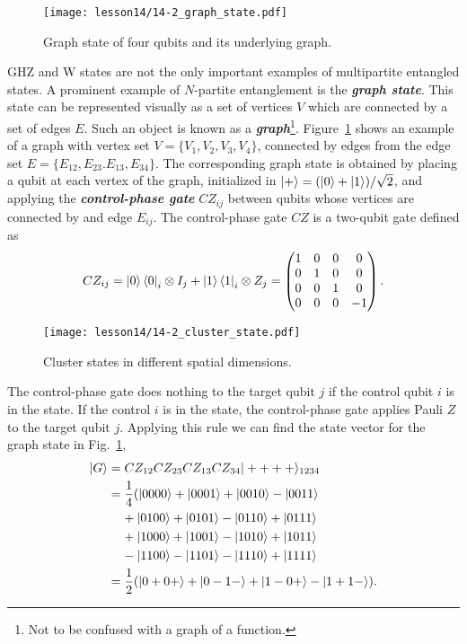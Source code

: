 \begin{figure}[t]
    \centering
    \texttt{[image: lesson14/14-2\_graph\_state.pdf]}
    \caption[Graph state.]{Graph state of four qubits and its underlying graph.}
    \label{fig:14-2_graph_state}
\end{figure}

GHZ and W states are not the only important examples of multipartite entangled states.
A prominent example of $N$-partite entanglement is the \textbf{\textit{graph state}}.
This state can be represented visually as a set of vertices $V$ which are connected by a set of edges $E$.
Such an object is known as a \textit{\textbf{graph}}\footnote{Not to be confused with a graph of a function.}.
Figure~\ref{fig:14-2_graph_state} shows an example of a graph with vertex set $V=\{V_1, V_2, V_3, V_4\}$, connected by edges from the edge set $E=\{ E_{12}, E_{23}. E_{13}, E_{34} \}$.
The corresponding graph state is obtained by placing a qubit at each vertex of the graph, initialized in $\left| + \right\rangle = (\left| 0 \right\rangle + \left| 1 \right\rangle) / \sqrt{2}$, and applying the \textbf{\textit{control-phase gate}} $CZ_{ij}$ between qubits whose vertices are connected by and edge $E_{ij}$.
The control-phase gate $CZ$ is a two-qubit gate defined as
\begin{equation}
    CZ_{ij} = \left| 0 \right\rangle\left\langle 0 \right|_i \otimes I_j + \left| 1 \right\rangle\left\langle 1 \right|_i \otimes Z_j = \begin{pmatrix}
        1 & 0 & 0 & 0 \\
        0 & 1 & 0 & 0 \\
        0 & 0 & 1 & 0 \\
        0 & 0 & 0 & -1
    \end{pmatrix}.
\end{equation}
\begin{figure}[t]
    \centering
    \texttt{[image: lesson14/14-2\_cluster\_state.pdf]}
    \caption[Cluster state.]{Cluster states in different spatial dimensions.}
    \label{fig:14-2_cluster_state}
\end{figure}
The control-phase gate does nothing to the target qubit $j$ if the control qubit $i$ is in the  state.
If the control $i$ is in the  state, the control-phase gate applies Pauli $Z$ to the target qubit $j$.
Applying this rule we can find the state vector for the graph state  in Fig.~\ref{fig:14-2_graph_state},
\begin{align}
    \left| G \right\rangle & = CZ_{12} CZ_{23} CZ_{13} CZ_{34} |++++\rangle_{1234} \nonumber\\
    & = \frac{1}{4} ( |0000\rangle + |0001\rangle + |0010\rangle - |0011\rangle \nonumber\\
    & \; \; \; \; + |0100\rangle + |0101\rangle - |0110\rangle + |0111\rangle \\
    & \; \; \; \; + |1000\rangle + |1001\rangle - |1010\rangle + |1011\rangle \\
    & \; \; \; \; - |1100\rangle - |1101\rangle - |1110\rangle + |1111\rangle \\
    & = \frac{1}{2} ( |0+0+\rangle + |0-1-\rangle + |1-0+\rangle - |1+1-\rangle ).
\end{align}
